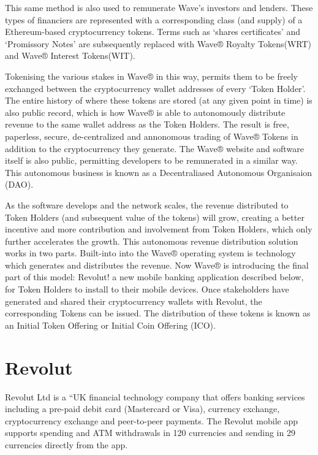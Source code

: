 \documentclass[letterpaper,10pt,openany,oneside,english]{sphinxmanual}
\begin{document}
\noindent{}

This same method is also used to remunerate Wave’s investors and lenders. These types of financiers are represented with a corresponding class (and supply) of a Ethereum-based cryptocurrency tokens. Terms such as ‘shares certificates’ and ‘Promissory Notes’ are subsequently replaced with Wave® Royalty Tokens(WRT) and Wave® Interest Tokens(WIT).

Tokenising the various stakes in Wave® in this way, permits them to be freely exchanged between the cryptocurrency wallet addresses of every ‘Token Holder’. The entire history of where these tokens are stored (at any given point in time) is also public record, which is how Wave® is able to autonomously distribute revenue to the same wallet address as the Token Holders. The result is free, paperless, secure, de-centralized and annonomous trading of Wave® Tokens in addition to the cryptocurrency they generate. The Wave® website and software itself is also public, permitting developers to be remunerated in a similar way. This autonomous business is known as a Decentraliased Autonomous Organisaion (DAO).

As the software develops and the network scales, the revenue distributed to Token Holders (and subsequent value of the tokens) will grow,  creating a better incentive and more contribution and involvement from Token Holders, which only further accelerates the growth. This autonomous revenue distribution solution works in two parts. Built-into into the Wave® operating system is technology which generates and distributes the revenue. Now Wave® is introducing the final part of this model: Revolut! a new mobile banking application described below, for Token Holders to install to their mobile devices. Once stakeholders have generated and shared their cryptocurrency wallets with Revolut, the corresponding Tokens can be issued. The distribution of these tokens is known as an Initial Token Offering or Initial Coin Offering (ICO).


\section{Revolut}
\label{\detokenize{introduction:revolut}}
Revolut Ltd is a “UK financial technology company that offers banking services including a pre-paid debit card (Mastercard or Visa), currency exchange, cryptocurrency exchange and peer-to-peer payments. The Revolut mobile app supports spending and ATM withdrawals in 120 currencies and sending in 29 currencies directly from the app.
\end{document}
